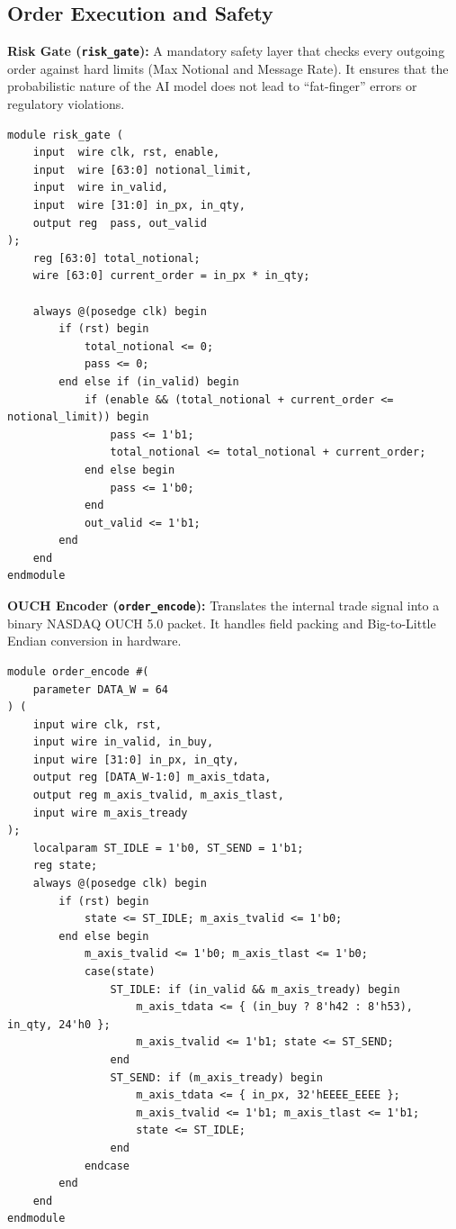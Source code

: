 \subsection{Order Execution and Safety}
\textbf{Risk Gate (\texttt{risk\_gate}):} A mandatory safety layer that checks every outgoing order against hard limits (Max Notional and Message Rate). It ensures that the probabilistic nature of the AI model does not lead to ``fat-finger'' errors or regulatory violations.

\begin{lstlisting}[style=verilogstyle, caption={Deterministic risk management module}, label={lst:risk_a}]
module risk_gate (
    input  wire clk, rst, enable,
    input  wire [63:0] notional_limit,
    input  wire in_valid,
    input  wire [31:0] in_px, in_qty,
    output reg  pass, out_valid
);
    reg [63:0] total_notional;
    wire [63:0] current_order = in_px * in_qty;

    always @(posedge clk) begin
        if (rst) begin
            total_notional <= 0;
            pass <= 0;
        end else if (in_valid) begin
            if (enable && (total_notional + current_order <= notional_limit)) begin
                pass <= 1'b1;
                total_notional <= total_notional + current_order;
            end else begin
                pass <= 1'b0;
            end
            out_valid <= 1'b1;
        end
    end
endmodule
\end{lstlisting}

\textbf{OUCH Encoder (\texttt{order\_encode}):} Translates the internal trade signal into a binary NASDAQ OUCH 5.0 packet. It handles field packing and Big-to-Little Endian conversion in hardware.

\begin{lstlisting}[style=verilogstyle, caption={Binary OUCH order encoder}, label={lst:encoder_a}]
module order_encode #(
    parameter DATA_W = 64
) (
    input wire clk, rst,
    input wire in_valid, in_buy,
    input wire [31:0] in_px, in_qty,
    output reg [DATA_W-1:0] m_axis_tdata,
    output reg m_axis_tvalid, m_axis_tlast,
    input wire m_axis_tready
);
    localparam ST_IDLE = 1'b0, ST_SEND = 1'b1;
    reg state;
    always @(posedge clk) begin
        if (rst) begin
            state <= ST_IDLE; m_axis_tvalid <= 1'b0;
        end else begin
            m_axis_tvalid <= 1'b0; m_axis_tlast <= 1'b0;
            case(state)
                ST_IDLE: if (in_valid && m_axis_tready) begin
                    m_axis_tdata <= { (in_buy ? 8'h42 : 8'h53), in_qty, 24'h0 }; 
                    m_axis_tvalid <= 1'b1; state <= ST_SEND;
                end
                ST_SEND: if (m_axis_tready) begin
                    m_axis_tdata <= { in_px, 32'hEEEE_EEEE };
                    m_axis_tvalid <= 1'b1; m_axis_tlast <= 1'b1;
                    state <= ST_IDLE;
                end
            endcase
        end
    end
endmodule
\end{lstlisting}

